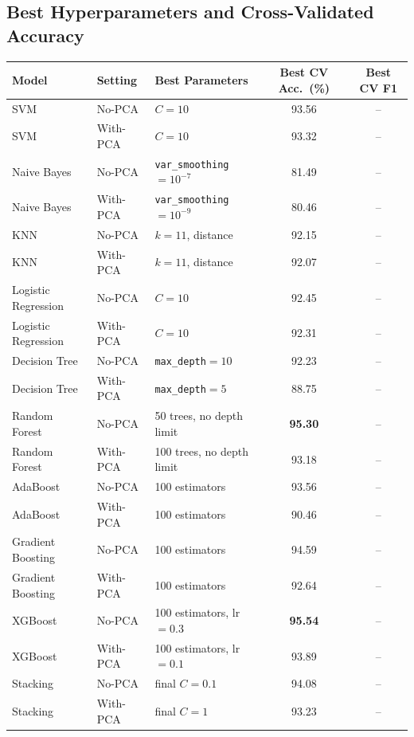 \documentclass[12pt,a4paper]{article}
\begin{document}
\subsection*{Best Hyperparameters and Cross-Validated Accuracy}
\begin{longtable}{lllcc}
\toprule
Model & Setting & Best Parameters & Best CV Acc.\ (\%) & Best CV F1 \\
\midrule
SVM & No-PCA & $C=10$ & 93.56 & -- \\
SVM & With-PCA & $C=10$ & 93.32 & -- \\
Naive Bayes & No-PCA & \texttt{var\_smoothing}$=10^{-7}$ & 81.49 & -- \\
Naive Bayes & With-PCA & \texttt{var\_smoothing}$=10^{-9}$ & 80.46 & -- \\
KNN & No-PCA & $k=11$, distance & 92.15 & -- \\
KNN & With-PCA & $k=11$, distance & 92.07 & -- \\
Logistic Regression & No-PCA & $C=10$ & 92.45 & -- \\
Logistic Regression & With-PCA & $C=10$ & 92.31 & -- \\
Decision Tree & No-PCA & \texttt{max\_depth}$=10$ & 92.23 & -- \\
Decision Tree & With-PCA & \texttt{max\_depth}$=5$ & 88.75 & -- \\
Random Forest & No-PCA & 50 trees, no depth limit & \textbf{95.30} & -- \\
Random Forest & With-PCA & 100 trees, no depth limit & 93.18 & -- \\
AdaBoost & No-PCA & 100 estimators & 93.56 & -- \\
AdaBoost & With-PCA & 100 estimators & 90.46 & -- \\
Gradient Boosting & No-PCA & 100 estimators & 94.59 & -- \\
Gradient Boosting & With-PCA & 100 estimators & 92.64 & -- \\
XGBoost & No-PCA & 100 estimators, lr$=0.3$ & \textbf{95.54} & -- \\
XGBoost & With-PCA & 100 estimators, lr$=0.1$ & 93.89 & -- \\
Stacking & No-PCA & final $C=0.1$ & 94.08 & -- \\
Stacking & With-PCA & final $C=1$ & 93.23 & -- \\
\bottomrule
\end{longtable}
\end{document}
